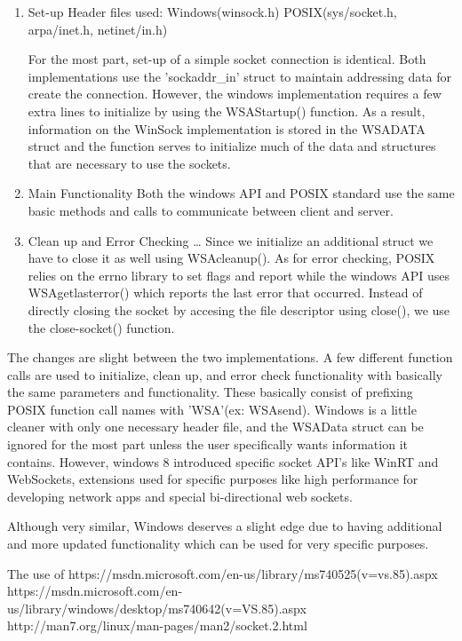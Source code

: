 \documentclass[letterpaper,10pt,titlepage]{article}
\begin{document}
\begin{enumerate}
  \item Set-up
Header files used: Windows(winsock.h)			POSIX(sys/socket.h, arpa/inet.h, netinet/in.h)

	For the most part, set-up of a simple socket connection is identical. Both implementations use the 'sockaddr_in'
struct to maintain addressing data for create the connection. However, the windows implementation requires a few extra lines
to initialize by using the WSAStartup() function. As a result, information on the WinSock implementation is stored in the WSADATA
struct and the function serves to initialize much of the data and structures that are necessary to use the sockets.


  \item Main Functionality
	Both the windows API and POSIX standard use the same basic methods and calls to communicate between
client and server.


  \item Clean up and Error Checking \ldots
	Since we initialize an additional struct we have to close it as well using WSAcleanup(). As for error 
checking, POSIX relies on the errno library to set flags and report while the windows API uses 
WSAgetlasterror() which reports the last error that occurred. Instead of directly closing the socket by
accesing the file descriptor using close(), we use the close-socket() function.
\end{enumerate}
	The changes are slight between the two implementations. A few different function calls are used to 
initialize, clean up, and error check functionality with basically the same parameters and functionality. These
basically consist of prefixing POSIX function call names with 'WSA'(ex: WSAsend). Windows is a little cleaner 
with only one necessary header file, and the WSAData struct can be ignored for the most part unless the user 
specifically wants information it contains. However, windows 8 introduced specific socket API's like WinRT 
and WebSockets, extensions used for specific purposes like high performance for developing network apps and special bi-directional web sockets.

Although very similar, Windows deserves a slight edge due to having additional and more updated functionality
which can be used for very specific purposes.


	The use of 
https://msdn.microsoft.com/en-us/library/ms740525(v=vs.85).aspx	
https://msdn.microsoft.com/en-us/library/windows/desktop/ms740642(v=VS.85).aspx
http://man7.org/linux/man-pages/man2/socket.2.html
\end{document}
